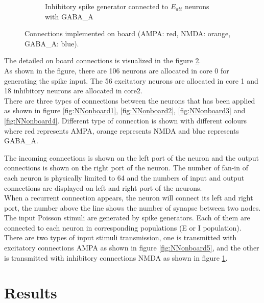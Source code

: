 \begin{figure}
\begin{subfigure}{\textwidth}
		\caption{Inhibitory spike generator connected to $E_{att}$ neurons with GABA\_A}
		\label{fig:NNonboard6}
	\end{subfigure}
	\caption{Connections implemented on board (AMPA: red, NMDA: orange, GABA\_A: blue).}
	\label{fig:NNonboard}
\end{figure}

The detailed on board connections is visualized in the figure \ref{fig:NNonboard}. \\

As shown in the figure, there are 106 neurons are allocated in core 0 for generating the spike input. The 56 excitatory neurons are allocated in core 1 and 18 inhibitory neurons are allocated in core2. \\

There are three types of connections between the neurons that has been applied as shown in figure \ref{fig:NNonboard1}, \ref{fig:NNonboard2}, \ref{fig:NNonboard3} and \ref{fig:NNonboard4}.
Different type of connection is shown with different colours where red represents AMPA, orange represents NMDA and blue represents GABA\_A. 

The incoming connections is shown on the left port of the neuron and the output connections is shown on the right port of the neuron. The number of fan-in of each neuron is physically limited to 64 and the numbers of input and output connections are displayed on left and right port of the neurons.\\

When a recurrent connection appears, the neuron will connect its left and right port, the number above the line shows the number of synapse between two nodes.\\

The input Poisson stimuli are generated by spike generators. Each of them are connected to each neuron in corresponding populations (E or I population).
There are two types of input stimuli transmission, one is transmitted with excitatory connections AMPA as shown in figure \ref{fig:NNonboard5}, and the other is transmitted with inhibitory connections NMDA as shown in figure \ref{fig:NNonboard6}. 

\section{Results}

